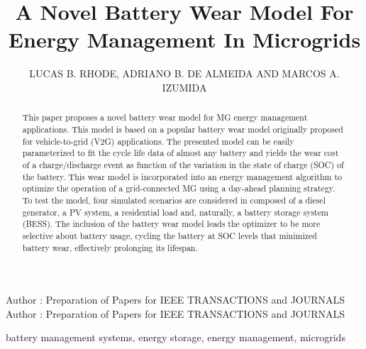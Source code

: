 \documentclass{ieeeaccess}
\begin{document}
    


    \title{A Novel Battery Wear Model For Energy Management In Microgrids}

    \author{
    	\uppercase{Lucas B. Rhode},
    	\uppercase{Adriano B. de Almeida}
    	\uppercase{and Marcos A. Izumida}
    }
    \address[1]{Sustainable Energies Center, CERTI Foundation, Brazil (e-mail: lrh@certi.org.br)}
    \address[2]{Western Parana State University, Brazil (e-mail: adriano.almeida@unioeste.br)}
    \address[3]{Sustainable Energies Center, CERTI Foundation, Brazil (e-mail: mlz@certi.org.br)}

    \markboth
    {Author \headeretal: Preparation of Papers for IEEE TRANSACTIONS and JOURNALS}
    {Author \headeretal: Preparation of Papers for IEEE TRANSACTIONS and JOURNALS}


    \begin{abstract}
        This paper proposes a novel battery wear model for \ac{MG} energy management applications. This model is based on a popular battery wear model originally proposed for vehicle-to-grid (V2G) applications. The presented model can be easily parameterized to fit the cycle life data of almost any battery and yields the wear cost of a charge/discharge event as function of the variation in the state of charge (SOC) of the battery. This wear model is incorporated into an energy management algorithm to optimize the operation of a grid-connected \ac{MG} using a day-ahead planning strategy. To test the model, four simulated scenarios are considered in  composed of a diesel generator, a \ac{PV} system, a residential load and, naturally, a battery storage system (\ac{BESS}). The inclusion of the battery wear model leads the optimizer to be more selective about battery usage, cycling the battery at \ac{SOC} levels that minimized battery wear, effectively prolonging its lifespan.
    \end{abstract}

    \begin{keywords}
        battery management systems, energy storage, energy management, microgrids
    \end{keywords}

    \titlepgskip=-15pt
\end{document}
